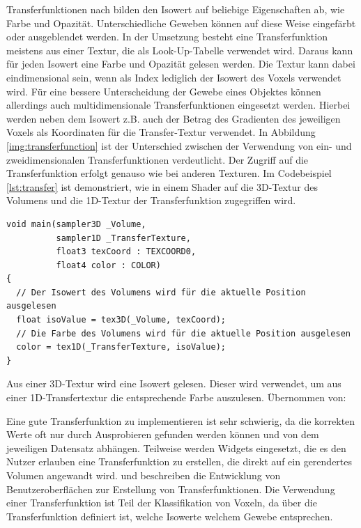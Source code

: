 Transferfunktionen nach \cite{Fernando04} bilden den Isowert auf beliebige Eigenschaften ab, wie  Farbe und Opazität.  Unterschiedliche Geweben können auf diese Weise eingefärbt oder ausgeblendet werden. In der Umsetzung besteht eine Transferfunktion meistens aus einer Textur, die als Look-Up-Tabelle verwendet wird. Daraus kann für jeden Isowert eine Farbe und Opazität gelesen werden. Die Textur kann dabei eindimensional sein, wenn als Index lediglich der Isowert des Voxels verwendet wird. Für eine bessere Unterscheidung der Gewebe eines Objektes können allerdings auch multidimensionale Transferfunktionen eingesetzt werden. Hierbei werden neben dem Isowert z.B. auch der Betrag des Gradienten des jeweiligen Voxels als Koordinaten für die Transfer-Textur verwendet. In Abbildung \ref{img:transferfunction} ist der Unterschied zwischen der Verwendung von ein- und zweidimensionalen Transferfunktionen verdeutlicht. Der Zugriff auf die Transferfunktion erfolgt genauso wie bei anderen Texturen. Im Codebeispiel \ref{lst:transfer} ist demonstriert, wie in einem Shader auf die 3D-Textur des Volumens und die 1D-Textur der Transferfunktion zugegriffen wird. 

\begin{listing}[!htb]
\begin{verbatim}
void main(sampler3D _Volume,
          sampler1D _TransferTexture,
          float3 texCoord : TEXCOORD0,
          float4 color : COLOR)
{
  // Der Isowert des Volumens wird für die aktuelle Position ausgelesen
  float isoValue = tex3D(_Volume, texCoord);
  // Die Farbe des Volumens wird für die aktuelle Position ausgelesen
  color = tex1D(_TransferTexture, isoValue);
}
\end{verbatim}
\caption{Aus einer 3D-Textur wird eine Isowert gelesen. Dieser wird verwendet, um aus einer 1D-Transfertextur die entsprechende Farbe auszulesen. Übernommen von: \cite{Fernando04}}
\label{lst:transfer}
\end{listing}
\FloatBarrier

Eine gute Transferfunktion zu implementieren ist sehr schwierig, da die korrekten Werte oft nur durch Ausprobieren gefunden werden können und von dem jeweiligen Datensatz abhängen. Teilweise werden Widgets eingesetzt, die es den Nutzer erlauben eine Transferfunktion zu erstellen, die direkt auf ein gerendertes Volumen angewandt wird.
\cite{salama06} und \cite{Knig99} beschreiben die Entwicklung von Benutzeroberflächen zur Erstellung von Transferfunktionen.
Die Verwendung einer Transferfunktion ist Teil der Klassifikation von Voxeln, da über die Transferfunktion definiert ist, welche Isowerte welchem Gewebe entsprechen.

